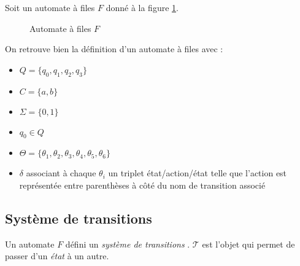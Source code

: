 \begin{example}
  Soit un automate à files $F$ donné à la figure \ref{fig:fifo1}.

  \begin{figure}[H]
    \centering
    \caption{Automate à files $F$}\label{fig:fifo1}
  \end{figure}

  On retrouve bien la définition d'un automate à files \fifo avec :
  \begin{itemize}
    \item $Q=\{q_0,q_1,q_2,q_3\}$
    \item $C=\{a,b\}$
    \item $\Sigma=\{0,1\}$
    \item $q_0\in Q$
    \item $\Theta=\{\theta_1, \theta_2, \theta_3, \theta_4, \theta_5, \theta_6\}$
    \item $\delta$ associant à chaque $\theta_i$ un triplet état/action/état telle que l'action est représentée entre parenthèses à côté du nom de transition associé
  \end{itemize}
\end{example}

\subsection{Système de transitions}\label{fifo:trans}


Un automate $F$ défini un \emph{système de transitions} \tsys. $\mathcal{T}$ est l'objet qui permet de passer d'un \emph{état} à un autre.

